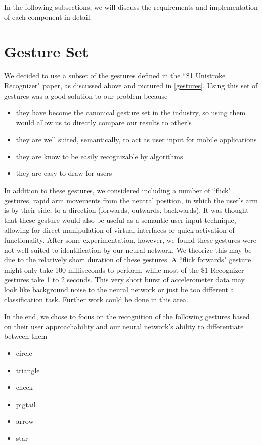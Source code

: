 \documentclass{report}
\begin{document}
In the following subsections, we will discuss the requirements and implementation of each component in detail.

\section{Gesture Set}


We decided to use a subset of the gestures defined in the ``\$1 Unistroke Recognizer" paper, as discussed above and pictured in \ref{gestures}. Using this set of gestures was a good solution to our problem because
\begin{itemize}
\item they have become the canonical gesture set in the industry, so using them would allow us to directly compare our results to other's
\item they are well suited, semantically, to act as user input for mobile applications
\item they are know to be easily recognizable by algorithms
\item they are easy to draw for users
\end{itemize}

In addition to these gestures, we considered including a number of ``flick" gestures, rapid arm movements from the neutral position, in which the user's arm is by their side, to a direction (forwards, outwards, backwards). It was thought that these gesture would also be useful as a semantic user input technique, allowing for direct manipulation of virtual interfaces or quick activation of functionality. After some experimentation, however, we found these gestures were not well suited to identification by our neural network. We theorize this may be due to the relatively short duration of these gestures. A ``flick forwards" gesture might only take 100 milliseconds to perform, while most of the \$1 Recognizer gestures take 1 to 2 seconds. This very short burst of accelerometer data may look like background noise to the neural network or just be too different a classification task. Further work could be done in this area.

In the end, we chose to focus on the recognition of the following gestures based on their user approachability and our neural network's ability to differentiate between them
\begin{itemize}
\item circle
\item triangle
\item check
\item pigtail
\item arrow
\item star
\end{itemize}
\end{document}
